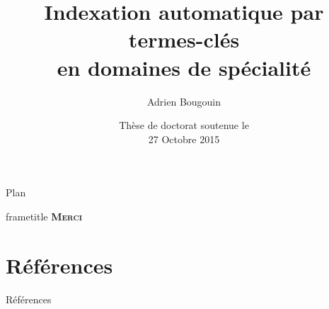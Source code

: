 \documentclass[10pt, xcolor={usenames, dvipsnames}]{beamer}
\title{Indexation automatique par termes-clés\\en domaines de spécialité}
\author{Adrien Bougouin}
\institute{\normalsize{Université de Nantes, LINA}}
\date{Thèse de doctorat soutenue le\\27 Octobre 2015}
\renewcommand\cite[2][]{\citep[#1]{#2}}
\begin{document}

  \begin{frame}
    \titlepage
  \end{frame}

  
  \begin{frame}{Plan}
    \tableofcontents
    \cite{bougouin2013topicrank}
  \end{frame}
  \begin{frame}
    \vfill
    \begin{beamercolorbox}[center,shadow=true,rounded=true]{frametitle} 
      \Huge{\textbf{\textsc{Merci}}}
    \end{beamercolorbox}
    \vfill
  \end{frame}
  \section*{Références}
    \begin{frame}[allowframebreaks]{Références}
      \def\newblock{\hskip .11em plus .33em minus .07em}
      
      
    \end{frame}
\end{document}
